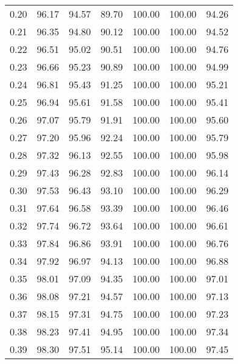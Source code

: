 \begin{tabular}{|c|c|c|c|c|c|c|}
      0.20 &     96.17 &     94.57 &      89.70 &  100.00 &     100.00 &         94.26 \\
      0.21 &     96.35 &     94.80 &      90.12 &  100.00 &     100.00 &         94.52 \\
      0.22 &     96.51 &     95.02 &      90.51 &  100.00 &     100.00 &         94.76 \\
      0.23 &     96.66 &     95.23 &      90.89 &  100.00 &     100.00 &         94.99 \\
      0.24 &     96.81 &     95.43 &      91.25 &  100.00 &     100.00 &         95.21 \\
      0.25 &     96.94 &     95.61 &      91.58 &  100.00 &     100.00 &         95.41 \\
      0.26 &     97.07 &     95.79 &      91.91 &  100.00 &     100.00 &         95.60 \\
      0.27 &     97.20 &     95.96 &      92.24 &  100.00 &     100.00 &         95.79 \\
      0.28 &     97.32 &     96.13 &      92.55 &  100.00 &     100.00 &         95.98 \\
      0.29 &     97.43 &     96.28 &      92.83 &  100.00 &     100.00 &         96.14 \\
      0.30 &     97.53 &     96.43 &      93.10 &  100.00 &     100.00 &         96.29 \\
      0.31 &     97.64 &     96.58 &      93.39 &  100.00 &     100.00 &         96.46 \\
      0.32 &     97.74 &     96.72 &      93.64 &  100.00 &     100.00 &         96.61 \\
      0.33 &     97.84 &     96.86 &      93.91 &  100.00 &     100.00 &         96.76 \\
      0.34 &     97.92 &     96.97 &      94.13 &  100.00 &     100.00 &         96.88 \\
      0.35 &     98.01 &     97.09 &      94.35 &  100.00 &     100.00 &         97.01 \\
      0.36 &     98.08 &     97.21 &      94.57 &  100.00 &     100.00 &         97.13 \\
      0.37 &     98.15 &     97.31 &      94.75 &  100.00 &     100.00 &         97.23 \\
      0.38 &     98.23 &     97.41 &      94.95 &  100.00 &     100.00 &         97.34 \\
      0.39 &     98.30 &     97.51 &      95.14 &  100.00 &     100.00 &         97.45 \\

\end{tabular}
